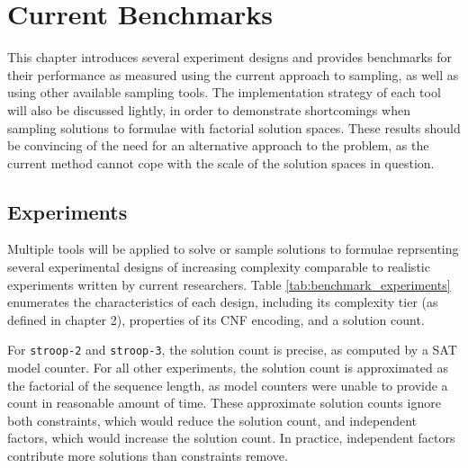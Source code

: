 
\chapter{Current Benchmarks}

This chapter introduces several experiment designs and provides benchmarks for their performance as measured using the current approach to sampling, as well as using other available sampling tools. The implementation strategy of each tool will also be discussed lightly, in order to demonstrate shortcomings when sampling solutions to formulae with factorial solution spaces. These results should be convincing of the need for an alternative approach to the problem, as the current method cannot cope with the scale of the solution spaces in question.

\section{Experiments}


Multiple tools will be applied to solve or sample solutions to formulae reprsenting several experimental designs of increasing complexity comparable to realistic experiments written by current researchers. Table \ref{tab:benchmark_experiments} enumerates the characteristics of each design, including its complexity tier (as defined in chapter 2), properties of its CNF encoding, and a solution count.

For \texttt{stroop-2} and \texttt{stroop-3}, the solution count is precise, as computed by a SAT model counter. For all other experiments, the solution count is approximated as the factorial of the sequence length, as model counters were unable to provide a count in reasonable amount of time. These approximate solution counts ignore both constraints, which would reduce the solution count, and independent factors, which would increase the solution count. In practice, independent factors contribute more solutions than constraints remove.

